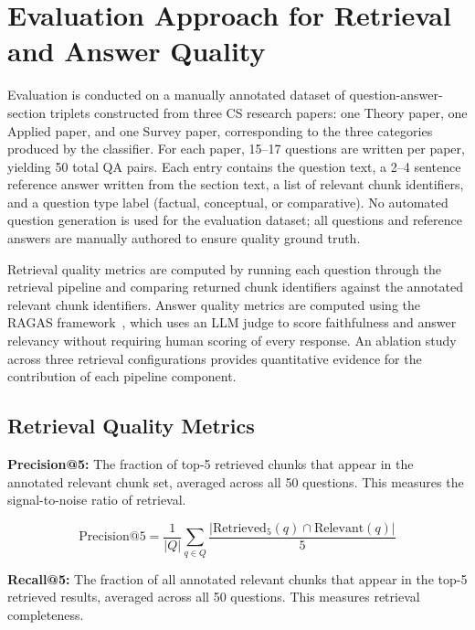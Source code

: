 \documentclass[12pt,a4paper]{report}
\begin{document}
\section{Evaluation Approach for Retrieval and Answer Quality}

Evaluation is conducted on a manually annotated dataset of question-answer-section
triplets constructed from three CS research papers: one Theory paper, one Applied
paper, and one Survey paper, corresponding to the three categories produced by the
classifier. For each paper, 15--17 questions are written per paper, yielding 50
total QA pairs. Each entry contains the question text, a 2--4 sentence reference
answer written from the section text, a list of relevant chunk identifiers, and a
question type label (factual, conceptual, or comparative). No automated question
generation is used for the evaluation dataset; all questions and reference answers
are manually authored to ensure quality ground truth.

Retrieval quality metrics are computed by running each question through the
retrieval pipeline and comparing returned chunk identifiers against the annotated
relevant chunk identifiers. Answer quality metrics are computed using the RAGAS
framework~\cite{es2023ragas}, which uses an LLM judge to score faithfulness and
answer relevancy without requiring human scoring of every response. An ablation
study across three retrieval configurations provides quantitative evidence for
the contribution of each pipeline component.

\subsection{Retrieval Quality Metrics}

\textbf{Precision@5:} The fraction of top-5 retrieved chunks that appear in the
annotated relevant chunk set, averaged across all 50 questions. This measures
the signal-to-noise ratio of retrieval.

\begin{equation}
\text{Precision@5} = \frac{1}{|Q|} \sum_{q \in Q}
\frac{|\text{Retrieved}_5(q) \cap \text{Relevant}(q)|}{5}
\end{equation}

\textbf{Recall@5:} The fraction of all annotated relevant chunks that appear in
the top-5 retrieved results, averaged across all 50 questions. This measures
retrieval completeness.
\end{document}
